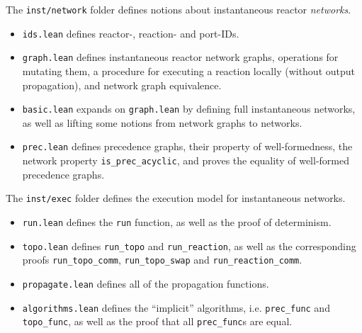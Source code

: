 \noindent The \verb|inst/network| folder defines notions about instantaneous reactor \emph{networks}.

\begin{itemize}
    \item \verb|ids.lean| defines reactor-, reaction- and port-IDs.
    \item \verb|graph.lean| defines instantaneous reactor network graphs, operations for mutating them, a procedure for executing a reaction locally (without output propagation), and network graph equivalence.
    \item \verb|basic.lean| expands on \verb|graph.lean| by defining full instantaneous networks, as well as lifting some notions from network graphs to networks.
    \item \verb|prec.lean| defines precedence graphs, their property of well-formedness, the network property \lstinline{is_prec_acyclic}, and proves the equality of well-formed precedence graphs.
\end{itemize}

\noindent The \verb|inst/exec| folder defines the execution model for instantaneous networks.

\begin{itemize}
    \item \verb|run.lean| defines the \lstinline{run} function, as well as the proof of determinism.
    \item \verb|topo.lean| defines \lstinline{run_topo} and \lstinline{run_reaction}, as well as the corresponding proofs \lstinline{run_topo_comm}, \lstinline{run_topo_swap} and \lstinline{run_reaction_comm}.
    \item \verb|propagate.lean| defines all of the propagation functions.
    \item \verb|algorithms.lean| defines the ``implicit'' algorithms, i.e. \lstinline{prec_func} and \lstinline{topo_func}, as well as the proof that all \lstinline{prec_func}s are equal.
\end{itemize}
